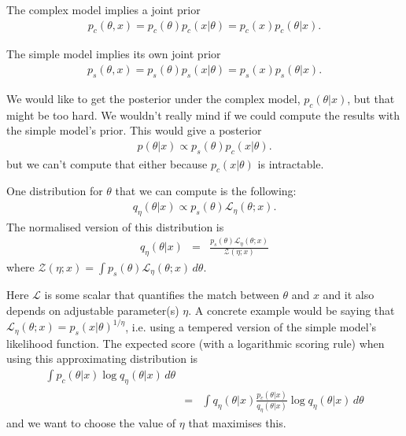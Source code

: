 \documentclass[a4paper, 11pt]{article}
\begin{document}

The complex model implies a joint prior
\begin{eqnarray}
p_c(\theta, x) = p_c(\theta)p_c(x|\theta) = p_c(x)p_c(\theta|x).
\end{eqnarray}

The simple model implies its own joint prior
\begin{eqnarray}
p_s(\theta, x) = p_s(\theta)p_s(x|\theta) = p_s(x)p_s(\theta|x).
\end{eqnarray}

We would like to get the posterior under the complex model, $p_c(\theta|x)$,
but that might be too hard.
We wouldn't really mind if we could compute the results with the
simple model's prior. This would give a posterior
\begin{eqnarray}
p(\theta | x) \propto p_s(\theta)p_c(x|\theta).
\end{eqnarray}
but we can't compute that either because $p_c(x|\theta)$ is intractable.

One distribution for $\theta$ that we can compute is the following:
\begin{eqnarray}
q_\eta(\theta | x) \propto p_s(\theta)\mathcal{L}_\eta(\theta; x).
\end{eqnarray}
The normalised version of this distribution is
\begin{eqnarray}
q_\eta(\theta | x) &=& \frac{p_s(\theta)\mathcal{L}_\eta(\theta; x)}
{\mathcal{Z}(\eta; x)}
\end{eqnarray}
where $\mathcal{Z}(\eta; x) = \int p_s(\theta)\mathcal{L}_\eta(\theta; x) \, d\theta$.

Here $\mathcal{L}$ is some scalar that quantifies the match between $\theta$ and
$x$ and it also depends on adjustable parameter(s) $\eta$. A concrete example
would be saying that $\mathcal{L}_\eta(\theta; x) = p_s(x|\theta)^{1/\eta}$, i.e.
using a tempered version of the simple model's likelihood function.
The expected score (with a logarithmic scoring rule) when using this approximating
distribution is
\begin{eqnarray}
\int p_c(\theta | x) \log q_\eta(\theta | x) \, d\theta\\
&=& \int q_\eta(\theta | x) \frac{p_c(\theta | x)}{q_\eta(\theta | x)} \log q_\eta(\theta | x) \, d\theta
\end{eqnarray}
and we want to choose the value of $\eta$ that maximises this.

\end{document}
